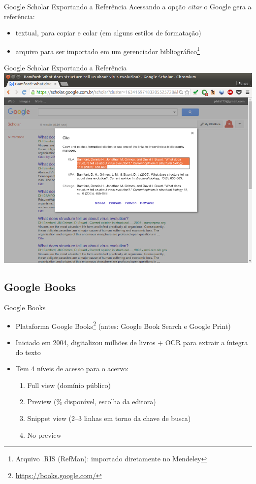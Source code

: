 \documentclass{beamer}
\begin{document}
\begin{frame}{Google Scholar Exportando a Referência}
  Acessando a opção {\em citar} o Google gera a referência:
  \begin{itemize}
    \footnotesize
  \item textual, para copiar e colar (em alguns estilos de formatação)
  \item arquivo para ser importado em um gerenciador
    bibliográfico\footnote{Arquivo .RIS (RefMan): importado
      diretamente no Mendeley}
  \end{itemize}
\end{frame}

\begin{frame}{Google Scholar Exportando a Referência}
  \centering
  \includegraphics[height=.85\textheight]{Busca/scholar-export}
\end{frame}

\subsection{Google Books}

\begin{frame}{Google Books}
  \begin{itemize}
    \footnotesize
  \item Plataforma \alert{Google
      Books}\footnote{\url{https://books.google.com/}} (antes: Google
    Book Search e Google Print)
  \item Iniciado em 2004, digitalizou milhões de livros + OCR para
    extrair a íntegra do texto
  \item Tem 4 níveis de acesso para o acervo:
    \begin{enumerate}
      \scriptsize
    \item Full view (domínio público)
    \item Preview (\% disponível, escolha da editora)
    \item Snippet view (2--3 linhas em torno da chave de busca)
    \item No preview
    \end{enumerate}
  \end{itemize}
\end{frame}
\end{document}

